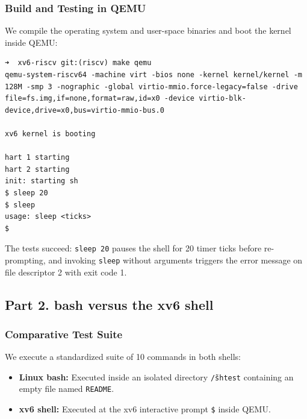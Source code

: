\documentclass{labreport}
\begin{document}
\subsubsection{Build and Testing in QEMU}
We compile the operating system and user-space binaries and boot the kernel inside QEMU:
\begin{lstlisting}[style=bash]
➜  xv6-riscv git:(riscv) make qemu
qemu-system-riscv64 -machine virt -bios none -kernel kernel/kernel -m 128M -smp 3 -nographic -global virtio-mmio.force-legacy=false -drive file=fs.img,if=none,format=raw,id=x0 -device virtio-blk-device,drive=x0,bus=virtio-mmio-bus.0

xv6 kernel is booting

hart 1 starting
hart 2 starting
init: starting sh
$ sleep 20
$ sleep
usage: sleep <ticks>
$
\end{lstlisting}
The tests succeed: \texttt{sleep 20} pauses the shell for 20 timer ticks before re-prompting, and invoking \texttt{sleep} without arguments triggers the error message on file descriptor 2 with exit code 1.

\subsection{Part 2. bash versus the xv6 shell}

\subsubsection{Comparative Test Suite}
We execute a standardized suite of 10 commands in both shells:
\begin{itemize}[noitemsep]
    \item \textbf{Linux bash:} Executed inside an isolated directory \texttt{\~/shtest} containing an empty file named \texttt{README}.
    \item \textbf{xv6 shell:} Executed at the xv6 interactive prompt \texttt{\$} inside QEMU.
\end{itemize}
\end{document}
